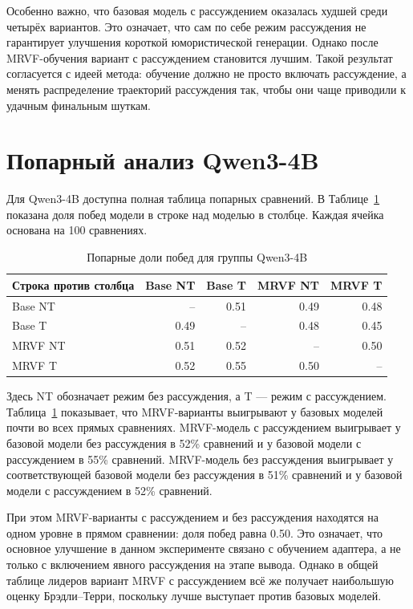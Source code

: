 Особенно важно, что базовая модель с рассуждением оказалась худшей среди четырёх вариантов. Это означает, что сам по себе режим рассуждения не гарантирует улучшения короткой юмористической генерации. Однако после MRVF-обучения вариант с рассуждением становится лучшим. Такой результат согласуется с идеей метода: обучение должно не просто включать рассуждение, а менять распределение траекторий рассуждения так, чтобы они чаще приводили к удачным финальным шуткам.

\section{Попарный анализ Qwen3-4B}

Для Qwen3-4B доступна полная таблица попарных сравнений. В Таблице~\ref{tab:pairwise-4b} показана доля побед модели в строке над моделью в столбце. Каждая ячейка основана на 100 сравнениях.

\begin{table}[h]
  \centering
  \caption{Попарные доли побед для группы Qwen3-4B}
  \label{tab:pairwise-4b}
  \begin{tabular}{lrrrr}
    \hline
    Строка против столбца & Base NT & Base T & MRVF NT & MRVF T \\
    \hline
    Base NT               & --      & 0.51   & 0.49    & 0.48   \\
    Base T                & 0.49    & --     & 0.48    & 0.45   \\
    MRVF NT               & 0.51    & 0.52   & --      & 0.50   \\
    MRVF T                & 0.52    & 0.55   & 0.50    & --     \\
    \hline
  \end{tabular}
\end{table}

Здесь NT обозначает режим без рассуждения, а T --- режим с рассуждением. Таблица~\ref{tab:pairwise-4b} показывает, что MRVF-варианты выигрывают у базовых моделей почти во всех прямых сравнениях. MRVF-модель с рассуждением выигрывает у базовой модели без рассуждения в 52\% сравнений и у базовой модели с рассуждением в 55\% сравнений. MRVF-модель без рассуждения выигрывает у соответствующей базовой модели без рассуждения в 51\% сравнений и у базовой модели с рассуждением в 52\% сравнений.

При этом MRVF-варианты с рассуждением и без рассуждения находятся на одном уровне в прямом сравнении: доля побед равна 0.50. Это означает, что основное улучшение в данном эксперименте связано с обучением адаптера, а не только с включением явного рассуждения на этапе вывода. Однако в общей таблице лидеров вариант MRVF с рассуждением всё же получает наибольшую оценку Брэдли--Терри, поскольку лучше выступает против базовых моделей.

